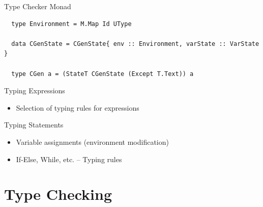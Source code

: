 \documentclass[dvipsnames,aspectratio=169]{beamer}
\begin{document}
\begin{frame}[fragile]{Type Checker Monad}

  \begin{verbatim}
  type Environment = M.Map Id UType

  data CGenState = CGenState{ env :: Environment, varState :: VarState }

  type CGen a = (StateT CGenState (Except T.Text)) a
  \end{verbatim}

\end{frame}


\begin{frame}{Typing Expressions}

  \begin{itemize}
    \item Selection of typing rules for expressions
  \end{itemize}


\end{frame}


\begin{frame}{Typing Statements}

  \begin{itemize}
    \item Variable assignments (environment modification)
    \item If-Else, While, etc. -- Typing rules
  \end{itemize}

\end{frame}




\section{Type Checking}
\end{document}
